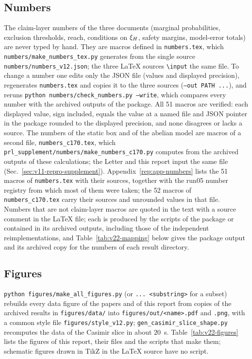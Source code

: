 \subsection{Numbers}\label{sec:v22-numbers}

The claim-layer numbers of the three documents (marginal probabilities, exclusion thresholds, reach, conditions on $\xi_H$, safety margins, model-error totals) are never typed by hand.
They are macros defined in \texttt{numbers.tex}, which \texttt{numbers/make\_numbers\_tex.py} generates from the single source \texttt{numbers/numbers\_v12.json}; the three LaTeX sources \texttt{\textbackslash input} the same file.
To change a number one edits only the JSON file (values and displayed precision), regenerates \texttt{numbers.tex} and copies it to the three sources (\texttt{--out PATH ...}), and reruns \texttt{python numbers/check\_numbers.py --write}, which compares every number with the archived outputs of the package.
All 51 macros are verified: each displayed value, sign included, equals the value at a named file and JSON pointer in the package rounded to the displayed precision, and none disagrees or lacks a source. %
The numbers of the static box and of the abelian model are macros of a second file, \texttt{numbers\_c170.tex}, which \texttt{prl\_supplement/\allowbreak numbers/\allowbreak make\_numbers\_c170.py} computes from the archived outputs of these calculations; the Letter and this report input the same file (Sec.~\ref{sec:v11-repro-supplement}).
Appendix~\ref{rep:app-numbers} lists the 51 macros of \texttt{numbers.tex} with their sources, together with the run05 number registry from which most of them were taken; the 52 macros of \texttt{numbers\_c170.tex} carry their sources and unrounded values in that file. %
Numbers that are not claim-layer macros are quoted in the text with a source comment in the LaTeX file; each is produced by the scripts of the package or contained in its archived outputs, including those of the independent reimplementations, and Table~\ref{tab:v22-mapping} below gives the package output and its archived copy for the numbers of each result directory.

\subsection{Figures}\label{sec:v22-figures}

\texttt{python figures/make\_all\_figures.py} (or \texttt{... <substring>} for a subset) rebuilds every data figure of the papers and of this report from copies of the archived results in \texttt{figures/data/} into \texttt{figures/out/<name>.pdf} and \texttt{.png}, with a common style file \texttt{figures/style\_v12.py}; \texttt{gen\_casimir\_slice\_shape.py} recomputes the data of the Casimir slice in about $20$~s.
Table~\ref{tab:v22-figures} lists the figures of this report, their files and the scripts that make them; schematic figures drawn in TikZ in the LaTeX source have no script.

